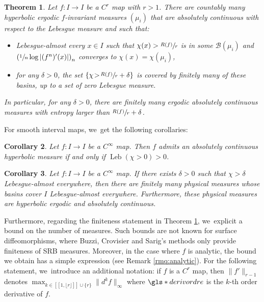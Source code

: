 \documentclass[JEP,XML,SOM,Unicode,NoFloatCountersInSection,published]{cedram}
\DeclareMathOperator{\Leb}{Leb}
\let\rC C
\newtheorem{thmtitle}{Theorem}
\newtheorem{cortitle}[thmtitle]{Corollary}
\theoremstyle{definition}
\begin{document}
\begin{thmtitle}
\label{thm:thm}
Let $f : I \to I$ be a $\rC^r$ map with $r > 1$.
There are countably many hyperbolic ergodic $f$\nobreakdash-invariant measures $(\mu_i)$ that are absolutely continuous with respect to the Lebesgue measure and such that:
\begin{itemize}
\item
Lebesgue-almost every $x \in I$ such that $\chi(x) > \sfrac{R(f)}{r}$ is in some $\mathcal{B}(\mu_i)$ and $\left (\sfrac{1}{n} \log |(f^n)'(x)| \right)_n$ converges to $\chi(x) = \chi(\mu_i)$,

\item
for any $\delta \!>\! 0$, the set $\left \{ \chi \!>\! \sfrac{R(f)}{r} + \delta \right \}$ is covered by finitely many of these basins, up to a set of zero Lebesgue measure.
\end{itemize}
In particular, for any $\delta > 0$, there are finitely many ergodic absolutely continuous measures with entropy larger than $\sfrac{R(f)}{r} + \delta$.
\end{thmtitle}

For smooth interval maps, we~get the following corollaries:

\begin{cortitle}
\label{cor:title}
Let $f : I \to I$ be a $\rC^{\infty}$ map.
Then $f$ admits an absolutely continuous hyperbolic measure if and only if $\Leb(\chi > 0) > 0$.
\end{cortitle}

\begin{cortitle}
\label{cor:title2}
Let $f : I \to I$ be a $\rC^{\infty}$ map. If there exists $\delta > 0$ such that $\chi > \delta$ Lebesgue-almost everywhere, then there are finitely many physical measures whose basins cover $I$ Lebesgue-almost everywhere.
Furthermore, these physical measures are hyperbolic ergodic and absolutely continuous.
\end{cortitle}

Furthermore, regarding the finiteness statement in Theorem \ref{thm:thm}, we~explicit a bound on the number of measures.
Such bounds are not known for surface diffeomorphisms, where Buzzi, Crovisier and Sarig's methods \cite{BCS_mme} only provide finiteness of SRB measures. Moreover, in the case where $f$ is analytic, the bound we obtain has a simple expression (see Remark \ref{rmq:analytic}).
For the following statement, we~introduce an additional notation: if $f$ is a $\rC^r$ map, then $\| f' \|_{r-1}$ denotes $\max_{k \in [\![ 1, \lfloor r \rfloor ]\!] \cup \{ r \}} \| d^k f \|_{\infty}$ where $\gls*{derivordre}$ is the $k$-th order derivative of $f$.
\end{document}
